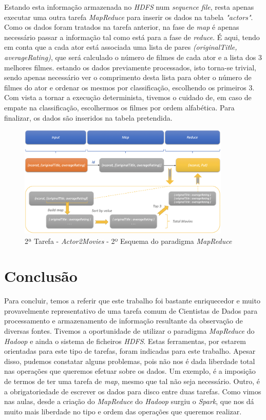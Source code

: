 \documentclass[a4paper]{report}
\begin{document}
{		Estando esta informação armazenada no \textit{HDFS} num \textit{sequence file}, resta apenas executar uma outra tarefa \textit{MapReduce} para inserir os dados na tabela \textit{"actors"}.
		Como os dados foram tratados na tarefa anterior, na fase de \textit{map} é apenas necessário passar a informação tal como está para a fase de \textit{reduce}. É aqui, tendo em conta que a cada ator está associada uma lista de pares \textit{(originalTitle, averageRating)}, que será calculado o número de filmes de cada ator e a lista dos 3 melhores filmes. estando os dados previamente processados, isto torna-se trivial, sendo apenas necessário ver o comprimento desta lista para obter o número de filmes do ator e ordenar os mesmos por classificação, escolhendo os primeiros 3. Com vista a tornar a execução determinista, tivemos o cuidado de, em caso de empate na classificação, escolhermos os filmes por ordem alfabética.
		Para finalizar, os dados são inseridos na tabela pretendida.
		\begin{figure}[H]
			\centering
			\includegraphics[width=0.9\textwidth]{Imagens/2ª Tarefa - Actor2Movies - 2º Esquema MapReduce.png}
			\caption{2ª Tarefa - \textit{Actor2Movies} - 2º Esquema do paradigma \textit{MapReduce}}
			\label{fig:20}
		\end{figure}
	}
	
	\chapter{Conclusão} \label{ch:Conclusion}
	\large{
		Para concluir, temos a referir que este trabalho foi bastante enriquecedor e muito provavelmente representativo de uma tarefa comum de Cientistas de Dados para processamento e armazenamento de informação resultante da observação de diversas fontes.
		Tivemos a oportunidade de utilizar o paradigma \textit{MapReduce} do \textit{Hadoop} e ainda o sistema de ficheiros \textit{HDFS}. Estas ferramentas, por estarem orientadas para este tipo de tarefas, foram indicadas para este trabalho. Apesar disso, pudemos constatar alguns problemas, pois não nos é dada liberdade total nas operações que queremos efetuar sobre os dados. Um exemplo, é a imposição de termos de ter uma tarefa de \textit{map}, mesmo que tal não seja necessário. Outro, é a obrigatoriedade de escrever os dados para disco entre duas tarefas.
		Como vimos nas aulas, desde a criação do \textit{MapReduce} do \textit{Hadoop} surgiu o \textit{Spark}, que nos dá muito mais liberdade no tipo e ordem das operações que queremos realizar.
	}
	
\end{document}
